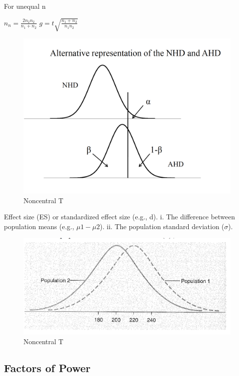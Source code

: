 \documentclass[]{book}
\theoremstyle{definition}
\theoremstyle{definition}
\theoremstyle{definition}
\theoremstyle{remark}
\begin{document}
For unequal n

\(n_n = \frac{2n_2n_2}{n_1 + n_2}\)
\(g = t\sqrt{\frac{n_1 + n_2}{n_1n_2}}\)

\begin{figure}
\centering
\includegraphics{img/hickspower3.png}
\caption{Noncentral T}
\end{figure}

Effect size (ES) or standardized effect size (e.g., d). i. The
difference between population means (e.g., \(\mu1-\mu2\)). ii. The
population standard deviation (\(\sigma\)).

\begin{figure}
\centering
\includegraphics{img/hickspower4.png}
\caption{Noncentral T}
\end{figure}

\subsection{Factors of Power}\label{factors-of-power}
\end{document}
